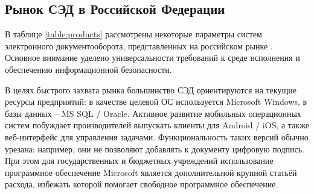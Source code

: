\subsection{Рынок СЭД в Российской Федерации} \label{review_products}

В таблице \ref{table:products} рассмотрены некоторые параметры систем электронного документооборота, представленных на российском рынке \cite{ixbt, evfrat}. Основное внимание уделено универсальности требований к среде исполнения и обеспечению информационной безопасности.

\vspace{\baselineskip}
В целях быстрого захвата рынка большинство СЭД ориентируются на текущие ресурсы предприятий: в качестве целевой ОС используется Microsoft Windows, в базы данных – MS SQL / Oracle. Активное развитие мобильных операционных систем побуждает производителей выпускать клиенты для Android / iOS, а также веб-интерфейс для управления задачами. Функциональность таких версий обычно урезана: например, они не позволяют добавлять к документу цифровую подпись. При этом для государственных и бюджетных учреждений использование программное обеспечение Microsoft является дополнительной крупной статьёй расхода, избежать которой помогает свободное программное обеспечение.

